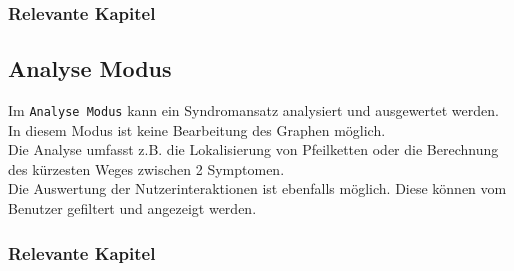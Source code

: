 \documentclass[enabledeprecatedfontcommands,fontsize=11pt,paper=a4,twoside]{scrartcl}
\newcounter{one}
\newcounter{two}[one]
\let\tempone\itemize
\let\temptwo\enditemize
\renewenvironment{itemize}{\tempone\addtolength{\itemsep}{-10.0pt}}{\temptwo}
\begin{document}
\subsubsection{Relevante Kapitel}
\begin{itemize}
	\item {}
	\item {}
	\item {}	
	\item {}	
	\item {}	
	\item {}
	\item {}
	\item {}
	\item {}
	\item {}
	\item {}
	\item {}
	\item {}
	\item {}	
\end{itemize}
\subsection{Analyse Modus}
Im \texttt{Analyse Modus} kann ein Syndromansatz analysiert und ausgewertet werden. In diesem Modus ist keine Bearbeitung des Graphen möglich. \\
Die Analyse umfasst z.B. die Lokalisierung von Pfeilketten oder die Berechnung des kürzesten Weges zwischen 2 Symptomen. \\
Die Auswertung der Nutzerinteraktionen ist ebenfalls möglich. Diese können vom Benutzer gefiltert und angezeigt werden. 
\subsubsection{Relevante Kapitel}
\begin{itemize}
	\item {}	
	\item {}
	\item {}
	\item {}
	\item {}
	\item {}
	\item {}
	\item {}
	\item {}
	\item {}	
	\item {}
\end{itemize}
\end{document}
